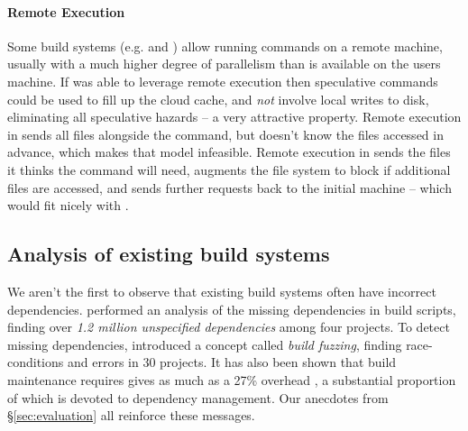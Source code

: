 \paragraph{Remote Execution} Some build systems (e.g. \Bazel and \BuildXL \cite{buildxl}) allow running commands on a remote machine, usually with a much higher degree of parallelism than is available on the users machine. If \Rattle was able to leverage remote execution then speculative commands could be used to fill up the cloud cache, and \emph{not} involve local writes to disk, eliminating all speculative hazards -- a very attractive property. Remote execution in \Bazel sends all files alongside the command, but \Rattle doesn't know the files accessed in advance, which makes that model infeasible. Remote execution in \BuildXL sends the files it thinks the command will need, augments the file system to block if additional files are accessed, and sends further requests back to the initial machine -- which would fit nicely with \Rattle.

\subsection{Analysis of existing build systems}

We aren't the first to observe that existing build systems often have incorrect dependencies.  \citet{bezemer2017empirical} performed an analysis of the missing dependencies in \Make build scripts, finding over \emph{1.2 million unspecified dependencies} among four projects. To detect missing dependencies, \citet{detecting_incorrect_build_rules} introduced a concept called \emph{build fuzzing}, finding race-conditions and errors in 30 projects. It has also been shown that build maintenance requires gives as much as a 27\% overhead \cite{build_maintenance}, a substantial proportion of which is devoted to dependency management. Our anecdotes from \S\ref{sec:evaluation} all reinforce these messages.

\begin{comment}
\subsection{Other related work}

The notion of hazards is used extensively in processor design. This is standard terminology.
\end{comment}
